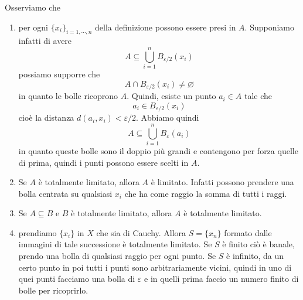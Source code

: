 \documentclass[a4paper]{article}
\begin{document}

Osserviamo che
\begin{enumerate}
    \item per ogni \(\{x_i\}_{i=1,\cdots, n}\) della definizione possono essere presi in \(A\).
    Supponiamo infatti di avere
    \[
        A \subseteq \bigcup_{i=1}^n B_{\varepsilon/2}(x_i)
    \]
    possiamo supporre che
    \[
        A \cap B_{\varepsilon/2}(x_i) \neq \varnothing
    \]
    in quanto le bolle ricoprono \(A\).
    Quindi, esiste un punto \(a_i \in A\) tale che
    \[
        a_i \in B_{\varepsilon/2}(x_i)
    \]
    cioè la distanza \(d(a_i, x_i) < \varepsilon/2\). Abbiamo quindi
    \[
        A \subseteq \bigcup_{i=1}^n B_{\varepsilon}(a_i)
    \]
    in quanto queste bolle sono il doppio più grandi e contengono per forza quelle di prima,
    quindi i punti possono essere scelti in \(A\).
    \item Se \(A\) è totalmente limitato, allora \(A\) è limitato.
    Infatti possono prendere una bolla centrata su qualsiasi \(x_i\) che ha come raggio la somma di tutti i raggi.
    \item Se \(A \subseteq B\) e \(B\) è totalmente limitato, allora \(A\) è totalmente limitato.
    \item prendiamo \(\{x_i\}\) in \(X\) che sia di Cauchy.
    Allora \(S = \{x_n\}\) formato dalle immagini di tale successione è totalmente limitato.
    Se \(S\) è finito ciò è banale, prendo una bolla di qualsiasi raggio per ogni punto.
    Se \(S\) è infinito, da un certo punto in poi tutti i punti sono arbitrariamente vicini, quindi in uno di quei punti
    facciamo una bolla di \(\varepsilon\) e in quelli prima faccio un numero finito di bolle per ricoprirlo.
\end{enumerate}


\end{document}
